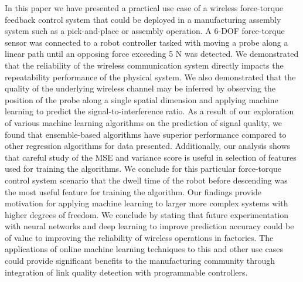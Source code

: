 In this paper we have presented a practical use case of a wireless force-torque feedback control system that could be deployed in a manufacturing assembly system such as a pick-and-place or assembly operation.  A 6-DOF force-torque sensor was connected to a robot controller tasked with moving a probe along a linear path until an opposing force exceeding 5 N was detected.  We demonstrated that the reliability of the wireless communication system directly impacts the repeatability performance of the physical system. We also demonstrated that the quality of the underlying wireless channel may be inferred by observing the position of the probe along a single spatial dimension and applying machine learning to predict the signal-to-interference ratio. As a result of our exploration of various machine learning algorithms on the prediction of signal quality, we found that ensemble-based algorithms have superior performance compared to other regression algorithms for data presented.  Additionally, our analysis shows that careful study of the MSE and variance score is useful in selection of features used for training the algorithms. We conclude for this particular force-torque control system scenario that the dwell time of the robot before descending was the most useful feature for training the algorithm. Our findings provide motivation for applying machine learning to larger more complex systems with higher degrees of freedom. We conclude by stating that future  experimentation with neural networks and deep learning to improve prediction accuracy could be of value to improving the reliability of wireless operations in factories. The applications of online machine learning techniques to this and other use cases could provide significant benefits to the manufacturing community through integration of link quality detection with programmable controllers.
